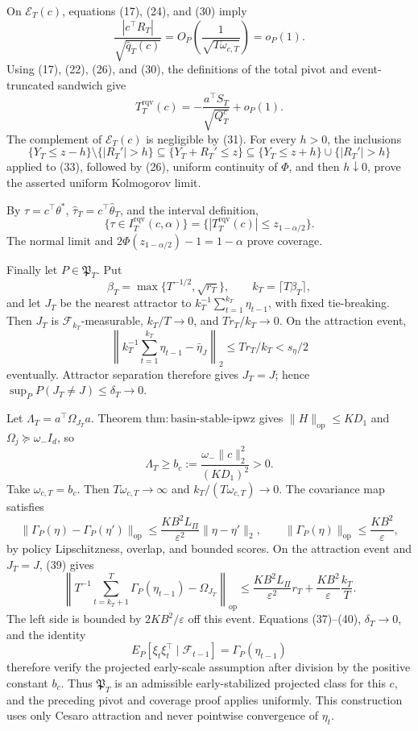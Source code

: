 On \(\mathcal E_T(c)\), equations (17), (24), and (30) imply
\[
 \frac{|c^\top R_T|}{\sqrt{\widehat q_T(c)}}
 =O_P\!\left(\frac1{\sqrt{T\omega_{c,T}}}\right)=o_P(1).
\tag{32}
\]
Using (17), (22), (26), and (30), the definitions of the total pivot and event-truncated sandwich give
\[
 T_T^{\mathrm{rqv}}(c)
 =-\frac{a^\top S_T}{\sqrt{Q_T^c}}+o_P(1).
\tag{33}
\]
The complement of \(\mathcal E_T(c)\) is negligible by (31). For every \(h>0\), the inclusions
\[
 \{Y_T\le z-h\}\setminus\{|R_T'|>h\}
 \subseteq\{Y_T+R_T'\le z\}
 \subseteq\{Y_T\le z+h\}\cup\{|R_T'|>h\}
\tag{34}
\]
applied to (33), followed by (26), uniform continuity of \(\Phi\), and then \(h\downarrow0\), prove the asserted uniform Kolmogorov limit.

By \(\tau=c^\top\theta^*\), \(\widehat\tau_T=c^\top\widehat\theta_T\), and the interval definition,
\[
 \{\tau\in I_T^{\mathrm{rqv}}(c,\alpha)\}
 =\{|T_T^{\mathrm{rqv}}(c)|\le z_{1-\alpha/2}\}.
\tag{35}
\]
The normal limit and \(2\Phi(z_{1-\alpha/2})-1=1-\alpha\) prove coverage.

Finally let \(P\in\mathfrak P_T\). Put
\[
 \beta_T=\max\{T^{-1/2},\sqrt{r_T}\},
 \qquad k_T=\lceil T\beta_T\rceil,
\tag{36}
\]
and let \(J_T\) be the nearest attractor to \(k_T^{-1}\sum_{t=1}^{k_T}\eta_{t-1}\), with fixed tie-breaking. Then \(J_T\) is \(\mathcal F_{k_T}\)-measurable, \(k_T/T\to0\), and \(Tr_T/k_T\to0\). On the attraction event,
\[
 \left\|k_T^{-1}\sum_{t=1}^{k_T}\eta_{t-1}-\bar\eta_J\right\|_2
 \le Tr_T/k_T<s_\eta/2
\tag{37}
\]
eventually. Attractor separation therefore gives \(J_T=J\); hence \(\sup_PP(J_T\ne J)\le\delta_T\to0\).

Let \(\Lambda_T=a^\top\Omega_{J_T}a\). Theorem \(\mathrm{thm:basin\text{-}stable\text{-}ipwz}\) gives \(\|H\|_{\mathrm{op}}\le KD_1\) and \(\Omega_j\succeq\omega_-I_d\), so
\[
 \Lambda_T\ge b_c:=\frac{\omega_-\|c\|_2^2}{(KD_1)^2}>0.
\tag{38}
\]
Take \(\omega_{c,T}=b_c\). Then \(T\omega_{c,T}\to\infty\) and \(k_T/(T\omega_{c,T})\to0\). The covariance map satisfies
\[
 \|\Gamma_P(\eta)-\Gamma_P(\eta')\|_{\mathrm{op}}
 \le\frac{KB^2L_\Pi}{\varepsilon^2}\|\eta-\eta'\|_2,
 \qquad \|\Gamma_P(\eta)\|_{\mathrm{op}}\le\frac{KB^2}{\varepsilon},
\tag{39}
\]
by policy Lipschitzness, overlap, and bounded scores. On the attraction event and \(J_T=J\), (39) gives
\[
 \left\|T^{-1}\sum_{t=k_T+1}^T\Gamma_P(\eta_{t-1})-\Omega_{J_T}\right\|_{\mathrm{op}}
 \le \frac{KB^2L_\Pi}{\varepsilon^2}r_T
 +\frac{KB^2}{\varepsilon}\frac{k_T}{T}.
\tag{40}
\]
The left side is bounded by \(2KB^2/\varepsilon\) off this event. Equations (37)--(40), \(\delta_T\to0\), and the identity
\[
 E_P[\xi_t\xi_t^\top\mid\mathcal F_{t-1}]=\Gamma_P(\eta_{t-1})
\tag{41}
\]
therefore verify the projected early-scale assumption after division by the positive constant \(b_c\). Thus \(\mathfrak P_T\) is an admissible early-stabilized projected class for this \(c\), and the preceding pivot and coverage proof applies uniformly. This construction uses only Cesaro attraction and never pointwise convergence of \(\eta_t\).